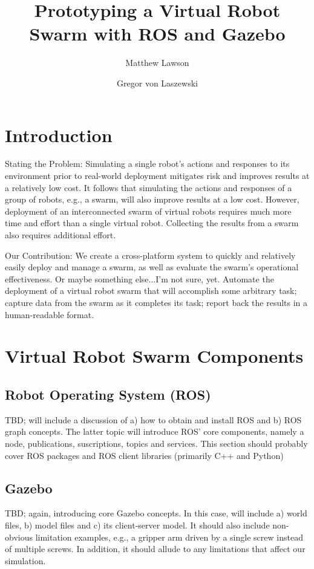 \documentclass[9pt,twocolumn,twoside]{styles/osajnl}
\title{Prototyping a Virtual Robot Swarm with ROS and Gazebo}
\author[1]{Matthew Lawson}
\author[1,*]{Gregor von Laszewski}
\affil[1]{School of Informatics and Computing, Bloomington, IN 47408, U.S.A.}
\affil[*]{Corresponding authors: laszewski@gmail.com}
\begin{document}
\maketitle

\section{Introduction}
Stating the Problem:
Simulating a single robot's actions and responses to its environment prior to real-world deployment mitigates risk and improves results at a relatively low cost. It follows that simulating the actions and responses of a group of robots, e.g., a swarm, will also improve results at a low cost.  However, deployment of an interconnected swarm of virtual robots requires much more time and effort than a single virtual robot.  Collecting the results from a swarm also requires additional effort.

Our Contribution:
We create a cross-platform system to quickly and relatively easily deploy and manage a swarm, as well as evaluate the swarm's operational effectiveness.  Or maybe something else...I'm not sure, yet.
Automate the deployment of a virtual robot swarm that will accomplish some arbitrary task; capture data from the swarm as it completes its task; report back the results in a human-readable format.

\section{Virtual Robot Swarm Components}
\subsection{Robot Operating System (ROS)}
TBD; will include a discussion of a) how to obtain and install ROS and b) ROS graph concepts.  The latter topic will introduce ROS' core components, namely a node, publications, suscriptions, topics and services.  This section should probably cover ROS packages and ROS client libraries (primarily C++ and Python)
\subsection{Gazebo}
TBD; again, introducing core Gazebo concepts.  In this case, will include a) world files, b) model files and c) its client-server model.  It should also include non-obvious limitation examples, e.g., a gripper arm driven by a single screw instead of multiple screws.  In addition, it should allude to any limitations that affect our simulation.
\end{document}
